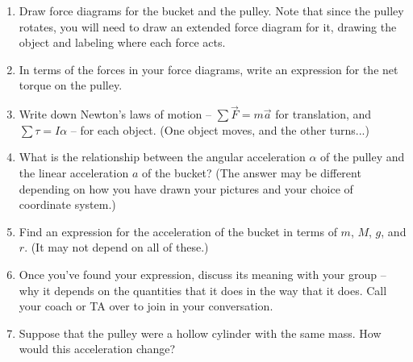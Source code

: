 \documentclass[12pt]{article}
\begin{document}
\begin{enumerate}

\item Draw force diagrams for the bucket and the pulley. Note that since the pulley rotates, you will need
to draw an extended force diagram for it, drawing the object and labeling where each force acts.

\vspace{3in}

\item In terms of the forces in your force diagrams, write an expression for the net torque on the pulley.

\vspace{1in}

\item Write down Newton's laws of motion -- $\sum \vec F = m \vec a$ for translation, and $\sum \tau = I \alpha$
-- for each object. (One object moves, and the other turns...)

\vspace{2in}


\newpage

\item What is the relationship between the angular acceleration $\alpha$ of the pulley and the linear acceleration
$a$ of the bucket? (The answer may be different depending on how you have drawn your pictures and your choice of
coordinate system.)

\vspace{1in}

\item Find an expression for the acceleration of the bucket in terms of $m$, $M$, $g$, and $r$. (It may not depend on all of these.)

\vspace{4.5in}

\item Once you've found your expression, discuss its meaning with your group -- why it depends on the quantities that it does in the way that it does. Call your coach or TA over to join in your conversation.

\newpage

\item Suppose that the pulley were a hollow cylinder with the same mass. How would this acceleration change?

\end{enumerate}
\end{document}
